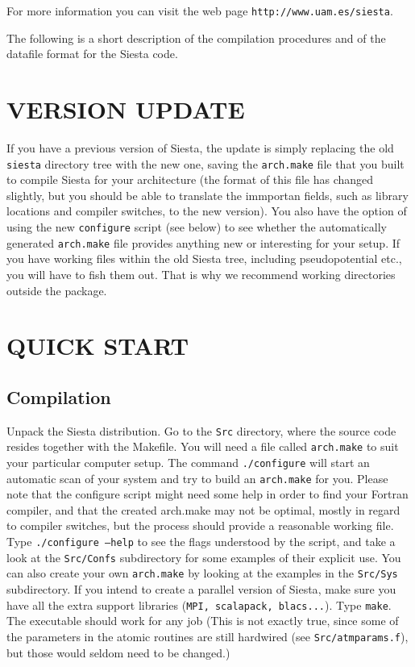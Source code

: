 \documentclass[11pt]{article}
\begin{document}
For more information you can visit the web page 
{\tt http://www.uam.es/siesta}.

The following is a short description of the compilation procedures
and of the datafile format for the {\sc Siesta} code.

\section{VERSION UPDATE}
If you have a previous version of {\sc Siesta}, the update is simply
replacing the old {\tt siesta} directory tree with the new one, saving
the {\tt arch.make} file that you built to compile {\sc Siesta} for
your architecture (the format of this file has changed slightly, but
you should be able to translate the immportan fields, such as library
locations and compiler switches, to the new version).
You also have the option of using the new {\tt configure} script
(see below) to see whether the automatically generated {\tt arch.make} file
provides anything new or interesting for your setup.
  If you have working files within the old {\sc Siesta} tree, including
pseudopotential etc., you will have to fish them out. That is why we recommend
working directories outside the package.

\section{QUICK START}

\subsection{Compilation}
Unpack the {\sc Siesta} distribution. Go to the {\tt Src} directory, 
where the source code resides together with the Makefile. You will
need a file called {\tt arch.make} to suit your particular computer
setup. The command {\tt ./configure}  will start an automatic scan of 
your system and try to build
an {\tt arch.make} for you. Please note that the configure script
might need some help in order to find your Fortran compiler, and that
the created arch.make may not be optimal, mostly in regard to compiler
switches, but the process should provide a reasonable working
file. Type {\tt ./configure --help} to see the flags understood by the
script, and take a look at the {\tt Src/Confs} subdirectory for some
examples of their explicit use. You can also create your own {\tt arch.make}
by looking at the examples in the {\tt Src/Sys} subdirectory.
If you intend to create a parallel version of {\sc
Siesta}, make sure you have all the extra support libraries ({\tt MPI,
scalapack, blacs...}). Type {\tt make}. The executable should work
for any job (This is not exactly true, since some of the parameters in
the atomic routines are still hardwired (see {\tt Src/atmparams.f}),
but those would seldom need to be changed.)
\end{document}

